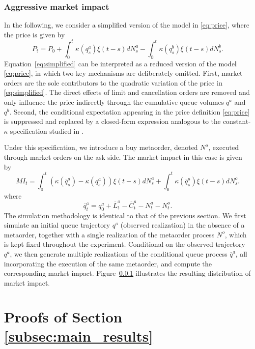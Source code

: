 \documentclass{article} %
\def\wb{\overline}
\newcommand{\1}{\mathbbm{1}} %
\begin{document}
\begin{as}
\subsubsection{Aggressive market impact}
In the following, we consider a simplified version of the model in \eqref{eq:price}, where the price is given by
\begin{equation}
\label{eq:simplified}
  P_t = P_0 + \int_0^t \kappa(q^a_s) \xi(t-s) dN^a_s - \int_0^t \kappa(q^b_s) \xi(t-s) dN^b_s.
\end{equation}
Equation~\eqref{eq:simplified} can be interpreted as a reduced version of the model \eqref{eq:price}, in which two key mechanisms are deliberately omitted. 
First, market orders are the sole contributors to the quadratic variation of the price in \eqref{eq:simplified}. 
The direct effects of limit and cancellation orders are removed and only influence the price indirectly through the cumulative queue volumes $q^a$ and $q^b$. 
Second, the conditional expectation appearing in the price definition \eqref{eq:price} is suppressed and replaced by a closed-form expression analogous to the constant-$\kappa$ specification studied in \cite{jaisson2015market}.

Under this specification, we introduce a buy metaorder, denoted $N^o$, executed through market orders on the ask side. The market impact in this case is given by
\begin{equation}
    MI_t = \int_0^t \left(\kappa(\wb q^{a}_s) - \kappa(q^a_s)\right) \xi(t-s) dN^a_s + \int_0^t \kappa(\wb q^{a}_s) \xi(t-s) dN^o_s.
\end{equation}
where
\begin{equation*}
\wb q^a_t = q_0^a + \wb L^{a}_t - \wb C^{a}_t - N^{a}_t - N^{o}_t.
\end{equation*}
The simulation methodology is identical to that of the previous section. We first simulate an initial queue trajectory $q^a$ (observed realization) in the absence of a metaorder, together with a single realization of the metaorder process $N^o$, which is kept fixed throughout the experiment. Conditional on the observed trajectory $q^a$, we then generate multiple realizations of the conditional queue process $\wb q^a$, all incorporating the execution of the same metaorder, and compute the corresponding market impact. Figure~\ref{} illustrates the resulting distribution of market impact.




\appendix
\section{Proofs of Section \ref{subsec:main_results}} \label{appendix:section_three_tree}


\end{as}
\end{document}
